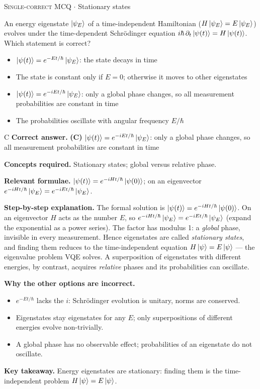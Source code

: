 \documentclass[11pt,a4paper]{article}
\newcommand{\optlabel}[1]{\textbf{(#1)}}
\newcommand{\correctlabel}[1]{\textcolor{okgreen}{\textbf{(#1)}\,\ding{51}}}
\newenvironment{qitem}[1]{\begin{list}{}{\setlength{\leftmargin}{3.3em}\setlength{\labelwidth}{3.1em}%
  \setlength{\labelsep}{0.2em}\setlength{\topsep}{3pt}\setlength{\parsep}{3pt}}\item[\textbf{Q.#1}\hfill]}{\end{list}}
\newcommand{\qmeta}[2]{{\footnotesize\color{black!60}\textsc{#1} \;$\cdot$\; #2}\par}
\begin{document}
\begin{qitem}{4}
\qmeta{Single-correct MCQ}{Stationary states}
An energy eigenstate $\ket{\psi_E}$ of a time-independent Hamiltonian ($H\ket{\psi_E} = E\ket{\psi_E}$) evolves under the time-dependent
Schr\"odinger equation $i\hbar\,\partial_t\ket{\psi(t)} = H\ket{\psi(t)}$. Which statement is correct?
\begin{itemize}[leftmargin=2.6em, labelsep=0.4em, itemsep=2pt, topsep=3pt]
\item[\optlabel{A}] $\ket{\psi(t)} = e^{-Et/\hbar}\ket{\psi_E}$: the state decays in time
\item[\optlabel{B}] The state is constant only if $E = 0$; otherwise it moves to other eigenstates
\item[\correctlabel{C}] $\ket{\psi(t)} = e^{-iEt/\hbar}\ket{\psi_E}$: only a global phase changes, so all measurement probabilities are constant in time
\item[\optlabel{D}] The probabilities oscillate with angular frequency $E/\hbar$
\end{itemize}
\end{qitem}
\begin{solbox}{C}
\textbf{\color{brand}Correct answer.} \textcolor{okgreen}{\textbf{(C)}} $\ket{\psi(t)} = e^{-iEt/\hbar}\ket{\psi_E}$: only a global phase changes, so all measurement probabilities are constant in time

\textbf{\color{brand}Concepts required.} Stationary states; global versus relative phase.

\textbf{\color{brand}Relevant formulae.} $\ket{\psi(t)} = e^{-iHt/\hbar}\ket{\psi(0)}$; on an eigenvector $e^{-iHt/\hbar}\ket{\psi_E} = e^{-iEt/\hbar}\ket{\psi_E}$.

\textbf{\color{brand}Step-by-step explanation.} The formal solution is $\ket{\psi(t)} = e^{-iHt/\hbar}\ket{\psi(0)}$. On an eigenvector $H$ acts as the number $E$, so
$e^{-iHt/\hbar}\ket{\psi_E} = e^{-iEt/\hbar}\ket{\psi_E}$ (expand the exponential as a power series). The factor has modulus 1: a
\emph{global} phase, invisible in every measurement. Hence eigenstates are called \emph{stationary states}, and finding them
reduces to the time-independent equation $H\ket\psi = E\ket\psi$ --- the eigenvalue problem VQE solves. A superposition of
eigenstates with different energies, by contrast, acquires \emph{relative} phases and its probabilities can oscillate.

\textbf{\color{brand}Why the other options are incorrect.}
\begin{itemize}[leftmargin=2.4em, itemsep=1pt, topsep=2pt]
\item[\textbf{(A)}] $e^{-Et/\hbar}$ lacks the $i$: Schr\"odinger evolution is unitary, norms are conserved.
\item[\textbf{(B)}] Eigenstates stay eigenstates for any $E$; only superpositions of different energies evolve non-trivially.
\item[\textbf{(D)}] A global phase has no observable effect; probabilities of an eigenstate do not oscillate.
\end{itemize}
\textbf{\color{brand}Key takeaway.} Energy eigenstates are stationary: finding them is the time-independent problem $H\ket\psi = E\ket\psi$.
\end{solbox}
\end{document}
